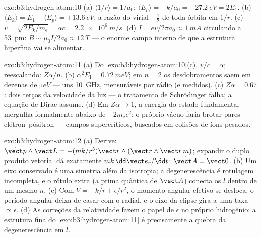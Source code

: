 \begin{solution}{exo:b3:hydrogen-atom:10}
(a) $\langle 1/r\rangle = 1/a_0$: $\langle E_p\rangle = -k/a_0 =
\qty{-27.2}{eV} = 2E_1$. (b) $\langle E_k\rangle = E_1 - \langle
E_p\rangle = +\qty{13.6}{eV}$: a razão do virial $-\tfrac12$ de toda
órbita em $1/r$. (c) $v = \sqrt{2E_k/m_{\text{e}}} = \alpha c =
\qty{2.2e6}{m/s}$. (d) $I = ev/2\pi a_0 \approx \qty{1}{mA}$
circulando a \qty{53}{pm}: $B \sim \mu_0I/2a_0 \approx
\qty{12}{T}$ --- o enorme campo interno de que a estrutura hiperfina
vai se alimentar.
\end{solution}

\begin{solution}{exo:b3:hydrogen-atom:11}
(a) Do \cref{exo:b3:hydrogen-atom:10}(c), $v/c = \alpha$;
reescalando: $Z\alpha/n$. (b) $\alpha^2E_{\text{I}} = \qty{0.72}{meV}$;
em $n = 2$ os desdobramentos saem em dezenas de $\unit{\micro eV}$ ---
uns \qty{10}{GHz}, mensuráveis por rádio (e medidos). (c) $Z\alpha =
0.67$: dois terços da velocidade da luz --- o tratamento de
Schrödinger falha; a equação de Dirac assume. (d) Em $Z\alpha \to 1$, a
energia do estado fundamental mergulha formalmente abaixo de
$-2m_{\text{e}}c^2$: o próprio vácuo faria brotar pares
elétron--pósitron --- campos supercríticos, buscados em colisões de
íons pesados.
\end{solution}

\begin{solution}{exo:b3:hydrogen-atom:12}
(a) Derive: $\dot{\vect p}\wedge\vect L = -(mk/r^3)\vect
r\wedge(\vect r\wedge\dot{\vect r}\,m)$; expandir o duplo produto
vetorial dá exatamente $mk\,\dd\vect e_r/\dd t$: $\dot{\vect A} =
\vect 0$. (b) Um eixo conservado é uma simetria além da isotropia; a
degenerescência é rotulagem incompleta, e o rótulo extra (a prima
quântica de $\vect
A$) conecta os $l$ dentro de um mesmo $n$. (c) Com
$V = -k/r + \epsilon/r^2$, o momento angular efetivo se desloca, o
período angular deixa de casar com o radial, e o eixo da elipse gira a
uma taxa $\propto\epsilon$. (d) As correções da relatividade fazem o
papel de $\epsilon$ no próprio hidrogênio: a estrutura fina do
\cref{exo:b3:hydrogen-atom:11} é precisamente a quebra da
degenerescência em $l$.
\end{solution}

